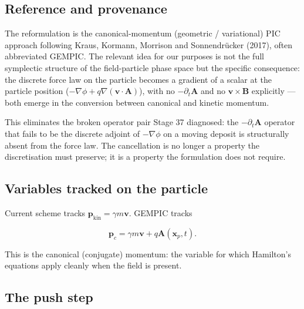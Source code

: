 \documentclass[11pt,a4paper]{article}
\newcommand{\vv}[1]{\mathbf{#1}}
\begin{document}
\subsection{Reference and provenance}

The reformulation is the canonical-momentum (geometric / variational)
PIC approach following Kraus, Kormann, Morrison and Sonnendrücker
(2017), often abbreviated GEMPIC.  The relevant idea for our purposes
is not the full symplectic structure of the field-particle phase
space but the specific consequence: the discrete force law on the
particle becomes a gradient of a scalar at the particle position
($-\nabla\phi + q\nabla(\vv{v}\cdot\vv{A})$), with no
$-\partial_t\vv{A}$ and no $\vv{v}\times\vv{B}$ explicitly --- both
emerge in the conversion between canonical and kinetic momentum.

This eliminates the broken operator pair Stage 37 diagnosed: the
$-\partial_t\vv{A}$ operator that fails to be the discrete adjoint of
$-\nabla\phi$ on a moving deposit is structurally absent from the
force law.  The cancellation is no longer a property the discretisation
must preserve; it is a property the formulation does not require.

\subsection{Variables tracked on the particle}

Current scheme tracks $\vv{p}_{\mathrm{kin}} = \gamma m \vv{v}$.  GEMPIC
tracks
\begin{eqbox}
\begin{equation}
\vv{p}_c = \gamma m \vv{v} + q \vv{A}(\vv{x}_p, t).
\label{eq:gempic_pc}
\end{equation}
\end{eqbox}
This is the canonical (conjugate) momentum: the variable for which
Hamilton's equations apply cleanly when the field is present.

\subsection{The push step}
\end{document}
